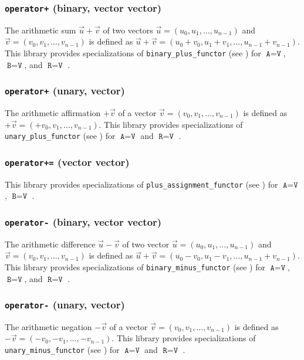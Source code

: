 \subsubsection{\texttt{operator+} (binary, vector vector)}
The arithmetic sum $\vec{u} + \vec{v}$ of two vectors $\vec{u}=\left(u_0,u_1,\ldots,u_{n-1}\right)$
and $\vec{v}=\left(v_0,v_1,\ldots,v_{n-1}\right)$  is defined as $\vec{u} + \vec{v} = \left(u_0   +
v_0, u_1 + v_1, \ldots, u_{n-1} + v_{n-1}\right)$.
%
This library provides specializations of \texttt{binary\_plus\_functor} (see \cite{arithmeticfunctors})
for $\texttt{A}=\texttt{V}$, $\texttt{B}=\texttt{V}$, and $\texttt{R} = \texttt{V}$ \ForAllVectors.

\subsubsection{\texttt{operator+} (unary, vector)}
The arithmetic affirmation $+\vec{v}$ of a vector $\vec{v}=\left(v_0,v_1,\ldots,v_{n-1}\right)$
is defined as $+\vec{v} = \left(+v_0,v_1,\ldots,v_{n-1}\right)$.
%
This library provides specializations of \texttt{unary\_plus\_functor} (see \cite{arithmeticfunctors})
for $\texttt{A}=\texttt{V}$ and $\texttt{R} = \texttt{V}$ \ForAllVectors.

\subsubsection{\texttt{operator+=} (vector vector)}
This library provides specializations of \texttt{plus\_assignment\_functor}  (see \cite{arithmeticfunctors})
for $\texttt{A} = \texttt{V}$, $\texttt{B} = \texttt{V}$ \ForAllVectors.

\subsubsection{\texttt{operator-} (binary, vector vector)}
The arithmetic difference $\vec{u} - \vec{v}$ of two vector $\vec{u}=\left(u_0,u_1,\ldots,u_{n-1}\right)$
and $\vec{v}=\left(v_0,v_1,\ldots,v_{n-1}\right)$ is defined as $\vec{u}+\vec{v} = \left(u_0 - v_0,
u_1 - v_1,\ldots,u_{n-1}+v_{n-1}\right)$.
%
This library provides specializations of \texttt{binary\_minus\_functor} (see \cite{arithmeticfunctors})
for $\texttt{A}=\texttt{V}$, $\texttt{B}=\texttt{V}$, and $\texttt{R} = \texttt{V}$ \ForAllVectors.

\subsubsection{\texttt{operator-} (unary, vector)}
The arithmetic negation $-\vec{v}$ of a vector $\vec{v}=\left(v_0,v_1,\ldots,v_{n-1}\right)$
is defined as $-\vec{v} = \left(-v_0, -v_1,\ldots, -v_{n-1}\right)$.
%
This library provides specializations of \texttt{unary\_minus\_functor} (see \cite{arithmeticfunctors})
for $\texttt{A}=\texttt{V}$ and $\texttt{R} = \texttt{V}$ \ForAllVectors.

